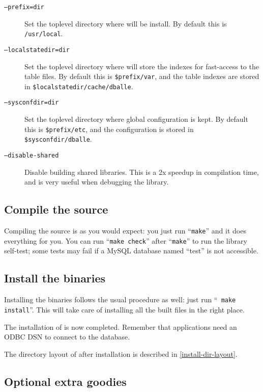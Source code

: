 \begin{description}
\item[{\tt --prefix=dir}] Set the toplevel directory where \dballe{} will be
                     install.  By default this is {\tt /usr/local}.
\item[{\tt --localstatedir=dir}] Set the toplevel directory where \dballe{} will
		     store the indexes for fast-access to the table files.  By
		     default this is {\tt \$prefix/var}, and the table indexes
		     are stored in {\tt \$localstatedir/cache/dballe}.
\item[{\tt --sysconfdir=dir}] Set the toplevel directory where global configuration
		     is kept.  By default this is {\tt \$prefix/etc}, and the
		     configuration is stored in {\tt \$sysconfdir/dballe}.
\item[{\tt --disable-shared}] Disable building shared libraries.  This is a 2x
		     speedup in compilation time, and is very useful when
		     debugging the library.
\end{description}

\subsection{Compile the source}

Compiling the source is as you would expect: you just run ``{\tt make}'' and it
does everything for you.  You can run ``{\tt make check}'' after ``{\tt make}''
to run the library self-test; some tests may fail if a MySQL database named
``test'' is not accessible.

\subsection{Install the binaries}

Installing the binaries follows the usual procedure as well: just run ``{\tt
make install}''.  This will take care of installing all the built files in the
right place.

The installation of \dballe{} is now completed.  Remember that \dballe{}
applications need an ODBC DSN to connect to the database.

The directory layout of \dballe{} after installation is described in
\ref{install-dir-layout}.


\subsection{Optional extra goodies}

